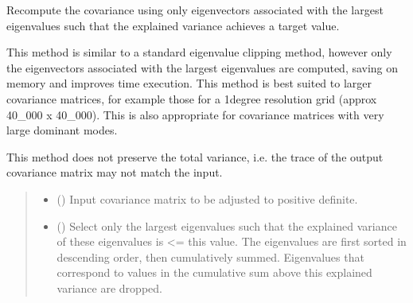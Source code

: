 \documentclass[letterpaper,10pt,english]{sphinxmanual}
\begin{document}
\begin{fulllineitems}
\label{\detokenize{misc:glomar_gridding.covariance_tools.eof_chop}}
\pysigstartsignatures
\pysiglinewithargsret
{}
{\sphinxparamcomma {}}
{}
\pysigstopsignatures
\sphinxAtStartPar
Re\sphinxhyphen{}compute the covariance using only eigenvectors associated with the
largest eigenvalues such that the explained variance achieves a target
value.

\sphinxAtStartPar
This method is similar to a standard eigenvalue clipping method, however
only the eigenvectors associated with the largest eigenvalues are computed,
saving on memory and improves time execution. This method is best suited to
larger covariance matrices, for example those for a 1\sphinxhyphen{}degree resolution
grid (approx 40\_000 x 40\_000). This is also appropriate for covariance
matrices with very large dominant modes.

\sphinxAtStartPar
This method does not preserve the total variance, i.e. the trace of the
output covariance matrix may not match the input.
\begin{quote}\begin{description}
\begin{itemize}
\item {}
\sphinxAtStartPar
{} () \textendash{} Input covariance matrix to be adjusted to positive definite.

\item {}
\sphinxAtStartPar
{} () \textendash{} Select only the largest eigenvalues such that the explained variance of
these eigenvalues is \textless{}= this value. The eigenvalues are first sorted in
descending order, then cumulatively summed. Eigenvalues that correspond
to values in the cumulative sum above this explained variance are
dropped.

\end{itemize}

\sphinxAtStartPar
{}


\end{description}
\end{quote}
\end{fulllineitems}
\end{document}
